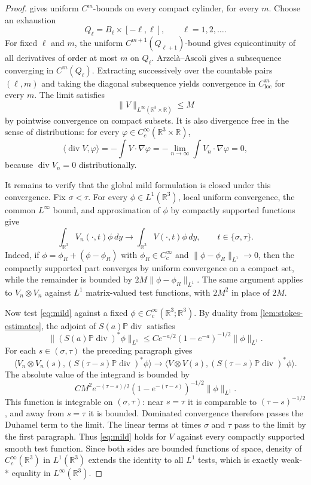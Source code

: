 \documentclass[11pt]{amsart}
\theoremstyle{plain}
\theoremstyle{definition}
\theoremstyle{remark}
\numberwithin{equation}{section}
\begin{document}
\begin{proof}
 gives uniform \(C^m\)-bounds on every compact
cylinder, for every \(m\).  Choose an exhaustion
\[
   Q_\ell=B_\ell\times[-\ell,\ell],\qquad \ell=1,2,\dots .
\]
For fixed \(\ell\) and \(m\), the uniform \(C^{m+1}(Q_{\ell+1})\)-bound gives
equicontinuity of all derivatives of order at most \(m\) on \(Q_\ell\).
Arzel\`a--Ascoli gives a subsequence converging in \(C^m(Q_\ell)\).  Extracting
successively over the countable pairs \((\ell,m)\) and taking the diagonal
subsequence yields convergence in \(C^m_{\mathrm{loc}}\) for every \(m\).
The limit satisfies
\[
   \|V\|_{L^\infty(\mathbb R^3\times\mathbb R)}\le M
\]
by pointwise convergence on compact subsets.  It is also divergence free in
the sense of distributions: for every
\(\varphi\in C_c^\infty(\mathbb R^3\times\mathbb R)\),
\[
   \langle \operatorname{div}V,\varphi\rangle
   =
   -\int V\cdot\nabla\varphi
   =
   -\lim_{n\to\infty}\int V_n\cdot\nabla\varphi
   =
   0,
\]
because \(\operatorname{div}V_n=0\) distributionally.

It remains to verify that the global mild formulation is closed under this
convergence.  Fix \(\sigma<\tau\).  For every \(\phi\in L^1(\mathbb R^3)\), local
uniform convergence, the common \(L^\infty\) bound, and approximation of
\(\phi\) by compactly supported functions give
\[
   \int_{\mathbb R^3} V_n(\cdot,t)\phi\,dy
   \to
   \int_{\mathbb R^3} V(\cdot,t)\phi\,dy,
   \qquad t\in\{\sigma,\tau\}.
\]
Indeed, if \(\phi=\phi_R+(\phi-\phi_R)\) with \(\phi_R\in C_c^\infty\) and
\(\|\phi-\phi_R\|_{L^1}\to0\), then the compactly supported part converges by
uniform convergence on a compact set, while the remainder is bounded by
\(2M\|\phi-\phi_R\|_{L^1}\).  The same argument applies to
\(V_n\otimes V_n\) against \(L^1\) matrix-valued test functions, with
\(2M^2\) in place of \(2M\).

Now test \eqref{eq:mild} against a fixed
\(\phi\in C_c^\infty(\mathbb R^3;\mathbb R^3)\).  By duality from
\cref{lem:stokes-estimates}, the adjoint of
\(S(a)\mathbb P\operatorname{div}\) satisfies
\[
   \|(S(a)\mathbb P\operatorname{div})^*\phi\|_{L^1}
   \le
   C e^{-a/2}(1-e^{-a})^{-1/2}\|\phi\|_{L^1}.
\]
For each \(s\in(\sigma,\tau)\) the preceding paragraph gives
\[
   \langle V_n\otimes V_n(s), (S(\tau-s)\mathbb P\operatorname{div})^*\phi\rangle
   \to
   \langle V\otimes V(s), (S(\tau-s)\mathbb P\operatorname{div})^*\phi\rangle .
\]
The absolute value of the integrand is bounded by
\[
   C M^2 e^{-(\tau-s)/2}(1-e^{-(\tau-s)})^{-1/2}\|\phi\|_{L^1}.
\]
This function is integrable on \((\sigma,\tau)\): near \(s=\tau\) it is
comparable to \((\tau-s)^{-1/2}\), and away from \(s=\tau\) it is bounded.
Dominated convergence therefore passes the Duhamel term to the limit.  The
linear terms at times \(\sigma\) and \(\tau\) pass to the limit by the first
paragraph.  Thus \eqref{eq:mild} holds for \(V\) against every compactly
supported smooth test function.  Since both sides are bounded functions of
space, density of \(C_c^\infty(\mathbb R^3)\) in \(L^1(\mathbb R^3)\) extends
the identity to all \(L^1\) tests, which is exactly weak-* equality in
\(L^\infty(\mathbb R^3)\).
\end{proof}
\end{document}
